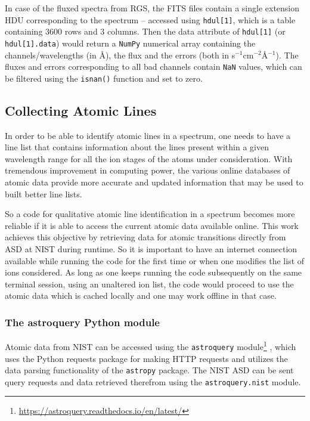                 In case of the fluxed spectra from RGS, the FITS files contain a single extension HDU corresponding to the spectrum -- accessed using \texttt{hdul[1]}, which is a table containing 3600 rows and 3 columns. Then the data attribute of \texttt{hdul[1]} (or \texttt{hdul[1].data}) would return a \texttt{NumPy} numerical array containing the channels/wavelengths (in \AA), the flux and the errors (both in s$^{-1}$cm$^{-2}$\AA$^{-1}$). The fluxes and errors corresponding to all bad channels contain \texttt{NaN} values, which can be filtered using the \texttt{isnan()} function and set to zero.
        
        \subsection{Collecting Atomic Lines} \label{tool:rgs-files:line-collection}
            In order to be able to identify atomic lines in a spectrum, one needs to have a line list that contains information about the lines present within a given wavelength range for all the ion stages of the atoms under consideration. With tremendous improvement in computing power, the various online databases of atomic data provide more accurate and updated information that may be used to built better line lists.
            
            So a code for qualitative atomic line identification in a spectrum becomes more reliable if it is able to access the current atomic data available online. This work achieves this objective by retrieving data for atomic transitions directly from ASD at NIST during runtime. So it is important to have an internet connection available while running the code for the first time or when one modifies the list of ions considered. As long as one keeps running the code subsequently on the same terminal session, using an unaltered ion list, the code would proceed to use the atomic data which is cached locally and one may work offline in that case.
            
            \subsubsection{The astroquery Python module} \label{tool:rgs-files:line-collection:astroquery}
                Atomic data from NIST can be accessed using the \texttt{astroquery} module\footnote{\url{https://astroquery.readthedocs.io/en/latest/}} \cite{ginsburg2019astroquery}, which uses the Python requests package for making HTTP requests and utilizes the data parsing functionality of the \texttt{astropy} package. The NIST ASD can be sent query requests and data retrieved therefrom using the \texttt{astroquery.nist} module.
            
